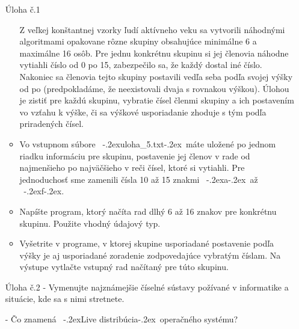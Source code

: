\documentclass[a4paper,twoside,12pt]{report}
\newcommand{\du}{\unskip\smash{\lower 1.4ex\hbox{\char34}}\kern-.2ex}
\newcommand{\hu}{\kern-.2ex\hbox{\char92}}
\begin{document}
{\begin{itemize}
\item[Úloha č.1]
\begin{itemize}
\item[]
 Z veľkej konštantnej vzorky ľudí aktívneho veku sa vytvorili náhodnými algoritmami opakovane rôzne skupiny obsahujúce minimálne 6 a maximálne 16 osôb. Pre jednu konkrétnu skupinu si jej členovia náhodne vytiahli číslo od 0 po 15, zabezpečilo sa, že každý dostal iné číslo. Nakoniec sa členovia tejto skupiny postavili vedľa seba podľa svojej výšky od  po  (predpokladáme, že neexistovali dvaja s rovnakou výškou). Úlohou je zistiť pre každú skupinu, vybratie čísel členmi skupiny a ich postavením vo vzťahu k výške, či sa výškové usporiadanie zhoduje s tým podľa priradených čísel.
\item
Vo vstupnom súbore \ \du uloha\_5.txt\hu \ máte uložené po jednom riadku informáciu pre skupinu, postavenie jej členov v rade od najmenšieho po najväčšieho v reči čísel, ktoré si vytiahli. Pre jednoduchosť sme zamenili čísla 10 až 15 znakmi \ \du a\hu \ až \ \du f\hu.     
\item
Napíšte program, ktorý načíta rad dlhý 6 až 16 znakov pre konkrétnu skupinu. Použite vhodný údajový typ.
\item
Vyšetrite v programe, v ktorej skupine usporiadané postavenie podľa výšky je aj usporiadané zoradenie zodpovedajúce vybratým číslam. Na výstupe vytlačte vstupný rad načítaný pre túto skupinu.
\end{itemize}

\item[Úloha č.2]
- Vymenujte najznámejšie číselné sústavy požívané v informatike a situácie, kde sa s nimi stretnete.

- Čo znamená \ \du Live distribúcia\hu \ operačného systému?
\end{itemize}
}%

\newpage
\end{document}
